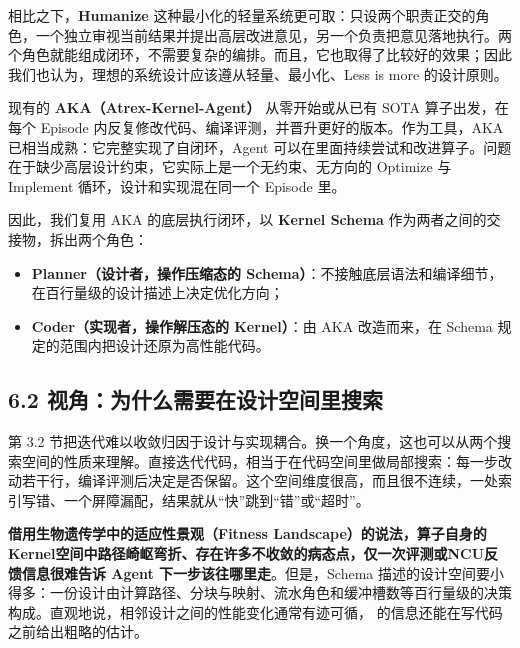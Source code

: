 相比之下，\textbf{Humanize} 这种最小化的轻量系统更可取：只设两个职责正交的角色，一个独立审视当前结果并提出高层改进意见，另一个负责把意见落地执行。两个角色就能组成闭环，不需要复杂的编排。而且，它也取得了比较好的效果；因此我们也认为，理想的系统设计应该遵从轻量、最小化、Less is more 的设计原则。


\begin{DiagramBlock}
\end{DiagramBlock}
现有的 \textbf{AKA（Atrex-Kernel-Agent）} 从零开始或从已有 SOTA 算子出发，在每个 Episode 内反复修改代码、编译评测，并晋升更好的版本。作为工具，AKA 已相当成熟：它完整实现了自闭环，Agent 可以在里面持续尝试和改进算子。问题在于缺少高层设计约束，它实际上是一个无约束、无方向的 Optimize 与 Implement 循环，设计和实现混在同一个 Episode 里。


因此，我们复用 AKA 的底层执行闭环，以 \textbf{Kernel Schema} 作为两者之间的交接物，拆出两个角色：


\begin{itemize}
\item
\textbf{Planner（设计者，操作压缩态的 Schema）}：不接触底层语法和编译细节，在百行量级的设计描述上决定优化方向；


\item
\textbf{Coder（实现者，操作解压态的 Kernel）}：由 AKA 改造而来，在 Schema 规定的范围内把设计还原为高性能代码。


\end{itemize}
\SourceSeparator
\subsection{6.2 视角：为什么需要在设计空间里搜索}
第 3.2 节把迭代难以收敛归因于设计与实现耦合。换一个角度，这也可以从两个搜索空间的性质来理解。直接迭代代码，相当于在代码空间里做局部搜索：每一步改动若干行，编译评测后决定是否保留。这个空间维度很高，而且很不连续，一处索引写错、一个屏障漏配，结果就从“快”跳到“错”或“超时”。

\textbf{借用生物遗传学中的适应性景观（Fitness Landscape）的说法，算子自身的Kernel空间中路径崎岖弯折、存在许多不收敛的病态点，仅一次评测或NCU反馈信息很难告诉 Agent 下一步该往哪里走}。但是，Schema 描述的设计空间要小得多：一份设计由计算路径、分块与映射、流水角色和缓冲槽数等百行量级的决策构成。直观地说，相邻设计之间的性能变化通常有迹可循， 的信息还能在写代码之前给出粗略的估计。

